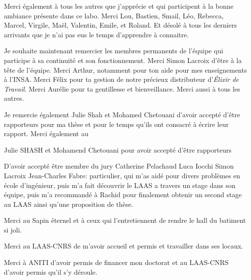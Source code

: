 Merci également à tous les autres que j'apprécie et qui participent à la bonne ambiance présente dans ce labo. 
Merci Lou, Bastien, Smail, Léo, Rebecca, Marcel, Virgile, Maël, Valentin, Emile, et Roland. 
Et désolé à tous les derniers arrivants que je n'ai pas eus le temps d'apprendre à connaitre. 



Je souhaite maintenant remercier les membres permanents de l'équipe qui participe à sa continuité et son fonctionnement.
Merci Simon Lacroix d'être à la tête de l'équipe.
Merci Arthur, notamment pour ton aide pour mes enseignements à l'INSA. 
Merci Félix pour ta gestion de notre précieux distributeur d'\textit{Élixir de Travail}.
Merci Aurélie pour ta gentillesse et bienveillance. 
Merci aussi à tous les autres.  



Je remercie également Julie Shah et Mohamed Chetouani d'avoir accepté d'être rapporteurs pour ma thèse et pour le temps qu'ils ont consacré à écrire leur rapport. 
Merci également au 


Julie SHASH et Mohamend Chetouani pour avoir accepté d'être rapporteurs

D'avoir accepté être membre du jury
Catherine Pelachaud
Luca Iocchi 
Simon Lacroix
Jean-Charles Fabre: particulier, qui m'as aidé pour divers problèmes en école d'ingénieur, puis m'a fait découvrir le LAAS a travers un stage dans son équipe, puis m'a recommandé à Rachid pour finalement obtenir un second stage au LAAS ainsi qu'une proposition de thèse. 



Merci au Sapin éternel et à ceux qui l'entretiennent de rendre le hall du batiment si joli.



Merci au LAAS-CNRS de m'avoir accueil et permis et travailler dans ses locaux. 

Merci à ANITI d'avoir permis de financer mon doctorat et au LAAS-CNRS d'avoir permis qu'il s'y déroule.
